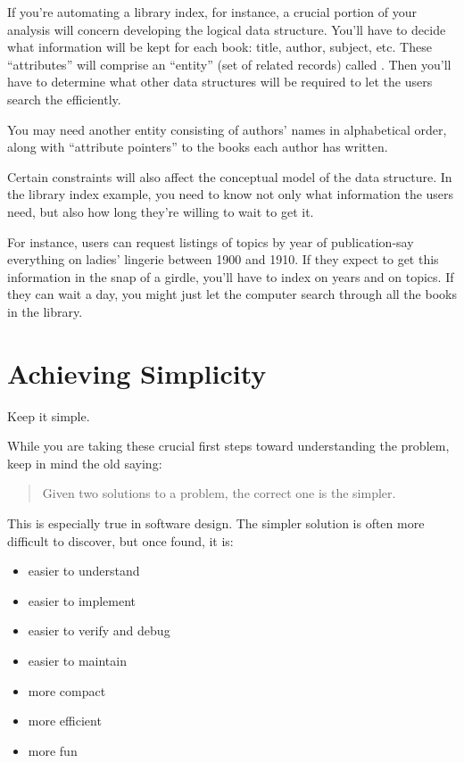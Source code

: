 If you're automating a library index, for instance, a crucial portion
of your analysis will concern developing the logical data structure. You'll
have to decide what information will be kept for each book: title, author,
subject, etc. These ``attributes'' will comprise an ``entity'' (set of related
records) called . Then you'll have to determine what other data
structures will be required to let the users search the  efficiently.




You may need another entity consisting of authors' names in
alphabetical order, along with ``attribute pointers'' to the books each author has
written.

Certain constraints will also affect the conceptual model of the data
structure. In the library index example, you need to know not only what
information the users need, but also how long they're willing to wait to
get it.

For instance, users can request listings of topics by year of
publication-say everything on ladies' lingerie between 1900 and 1910. If they
expect to get this information in the snap of a girdle, you'll have to index
on years and on topics. If they can wait a day, you might just let the
computer search through all the books in the library.

\section{Achieving Simplicity}

\begin{tip}
Keep it simple.
\end{tip}

\noindent While you are taking these crucial first steps toward understanding the
problem, keep in mind the old saying:

\begin{quotation}
\noindent Given two solutions to a problem, the correct one is the simpler.
\end{quotation}

\noindent This is especially true in software design. The simpler solution is often
more difficult to discover, but once found, it is:

\begin{itemize}
\item easier to understand
\item easier to implement
\item easier to verify and debug
\item easier to maintain
\item more compact
\item more efficient
\item more fun
\end{itemize}

